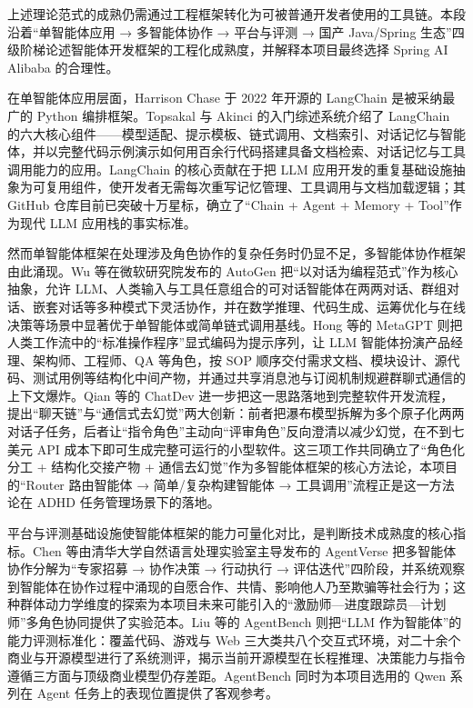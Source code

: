 \par 上述理论范式的成熟仍需通过工程框架转化为可被普通开发者使用的工具链。本段沿着``单智能体应用 → 多智能体协作 → 平台与评测 → 国产 Java/Spring 生态''四级阶梯论述智能体开发框架的工程化成熟度，并解释本项目最终选择 Spring AI Alibaba 的合理性。

\par 在单智能体应用层面，Harrison Chase 于 2022 年开源的 LangChain 是被采纳最广的 Python 编排框架。Topsakal 与 Akinci 的入门综述系统介绍了 LangChain 的六大核心组件——模型适配、提示模板、链式调用、文档索引、对话记忆与智能体，并以完整代码示例演示如何用百余行代码搭建具备文档检索、对话记忆与工具调用能力的应用\cite{topsakal2023langchain}。LangChain 的核心贡献在于把 LLM 应用开发的重复基础设施抽象为可复用组件，使开发者无需每次重写记忆管理、工具调用与文档加载逻辑；其 GitHub 仓库目前已突破十万星标，确立了``Chain + Agent + Memory + Tool''作为现代 LLM 应用栈的事实标准。

\par 然而单智能体框架在处理涉及角色协作的复杂任务时仍显不足，多智能体协作框架由此涌现。Wu 等在微软研究院发布的 AutoGen 把``以对话为编程范式''作为核心抽象，允许 LLM、人类输入与工具任意组合的可对话智能体在两两对话、群组对话、嵌套对话等多种模式下灵活协作，并在数学推理、代码生成、运筹优化与在线决策等场景中显著优于单智能体或简单链式调用基线\cite{wu2023autogen}。Hong 等的 MetaGPT 则把人类工作流中的``标准操作程序''显式编码为提示序列，让 LLM 智能体扮演产品经理、架构师、工程师、QA 等角色，按 SOP 顺序交付需求文档、模块设计、源代码、测试用例等结构化中间产物，并通过共享消息池与订阅机制规避群聊式通信的上下文爆炸\cite{hong2023metagpt}。Qian 等的 ChatDev 进一步把这一思路落地到完整软件开发流程，提出``聊天链''与``通信式去幻觉''两大创新：前者把瀑布模型拆解为多个原子化两两对话子任务，后者让``指令角色''主动向``评审角色''反向澄清以减少幻觉，在不到七美元 API 成本下即可生成完整可运行的小型软件\cite{qian2023chatdev}。这三项工作共同确立了``角色化分工 + 结构化交接产物 + 通信去幻觉''作为多智能体框架的核心方法论，本项目的``Router 路由智能体 → 简单/复杂构建智能体 → 工具调用''流程正是这一方法论在 ADHD 任务管理场景下的落地。

\par 平台与评测基础设施使智能体框架的能力可量化对比，是判断技术成熟度的核心指标。Chen 等由清华大学自然语言处理实验室主导发布的 AgentVerse 把多智能体协作分解为``专家招募 → 协作决策 → 行动执行 → 评估迭代''四阶段，并系统观察到智能体在协作过程中涌现的自愿合作、共情、影响他人乃至欺骗等社会行为\cite{chen2023agentverse}；这种群体动力学维度的探索为本项目未来可能引入的``激励师—进度跟踪员—计划师''多角色协同提供了实验范本。Liu 等的 AgentBench 则把``LLM 作为智能体''的能力评测标准化：覆盖代码、游戏与 Web 三大类共八个交互式环境，对二十余个商业与开源模型进行了系统测评，揭示当前开源模型在长程推理、决策能力与指令遵循三方面与顶级商业模型仍存差距\cite{liu2023agentbench}。AgentBench 同时为本项目选用的 Qwen 系列在 Agent 任务上的表现位置提供了客观参考。

